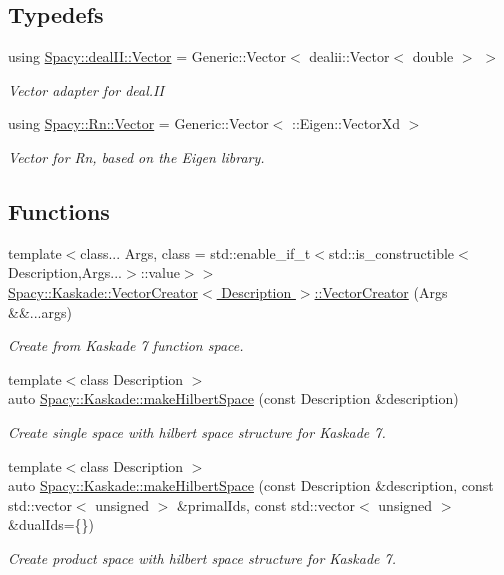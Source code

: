 \subsection*{Typedefs}
\begin{DoxyCompactItemize}
\item 
using \hyperlink{group__VectorSpaceGroup_ga65d64ee5f22f492639d0f950aa931071}{Spacy\-::deal\-I\-I\-::\-Vector} = Generic\-::\-Vector$<$ dealii\-::\-Vector$<$ double $>$ $>$
\begin{DoxyCompactList}\small\item\em Vector adapter for deal.\-I\-I \end{DoxyCompactList}\item 
using \hyperlink{group__VectorSpaceGroup_gafda42fd5aa3f7597a42b9831bf4dfd07}{Spacy\-::\-Rn\-::\-Vector} = Generic\-::\-Vector$<$ \-::Eigen\-::\-Vector\-Xd $>$
\begin{DoxyCompactList}\small\item\em Vector for Rn, based on the Eigen library. \end{DoxyCompactList}\end{DoxyCompactItemize}
\subsection*{Functions}
\begin{DoxyCompactItemize}
\item 
{\footnotesize template$<$class... Args, class  = std\-::enable\-\_\-if\-\_\-t$<$std\-::is\-\_\-constructible$<$\-Description,\-Args...$>$\-::value$>$$>$ }\\\hyperlink{group__VectorSpaceGroup_ga89de372343310640870077e6167df3f4}{Spacy\-::\-Kaskade\-::\-Vector\-Creator$<$ Description $>$\-::\-Vector\-Creator} (Args \&\&...args)
\begin{DoxyCompactList}\small\item\em Create from Kaskade 7 function space. \end{DoxyCompactList}\item 
{\footnotesize template$<$class Description $>$ }\\auto \hyperlink{group__VectorSpaceGroup_ga04d45446864bbf87770d02eade7b64cf}{Spacy\-::\-Kaskade\-::make\-Hilbert\-Space} (const Description \&description)
\begin{DoxyCompactList}\small\item\em Create single space with hilbert space structure for Kaskade 7. \end{DoxyCompactList}\item 
{\footnotesize template$<$class Description $>$ }\\auto \hyperlink{group__VectorSpaceGroup_ga221db25c41371a2a823a6b569d735ef6}{Spacy\-::\-Kaskade\-::make\-Hilbert\-Space} (const Description \&description, const std\-::vector$<$ unsigned $>$ \&primal\-Ids, const std\-::vector$<$ unsigned $>$ \&dual\-Ids=\{\})
\begin{DoxyCompactList}\small\item\em Create product space with hilbert space structure for Kaskade 7. \end{DoxyCompactList}\end{DoxyCompactItemize}


